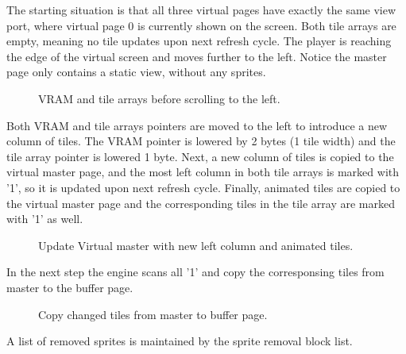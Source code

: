 \documentclass[book.tex]{subfiles}
\begin{document}
\vspace{0.5cm}
\par
\begin{minipage}{\textwidth}
  
\end{minipage}
\label{state_type}


\pagebreak

The starting situation is that all three virtual pages have exactly the same view port, where virtual page 0 is currently shown on the screen. Both tile arrays are empty, meaning no tile updates upon next refresh cycle. The player is reaching the edge of the virtual screen and moves further to the left. Notice the master page only contains a static view, without any sprites. 

\begin{figure}[H]
\centering
 \caption{VRAM and tile arrays before scrolling to the left.}
 \label{fig:kc4_6_step0}
\end{figure}

\pagebreak

Both VRAM and tile arrays pointers are moved to the left to introduce a new column of tiles. The VRAM pointer is lowered by 2 bytes (1 tile width) and the tile array pointer is lowered 1 byte. Next, a new column of tiles is copied to the virtual master page, and the most left column in both tile arrays is marked with '1', so it is updated upon next refresh cycle. Finally, animated tiles are copied to the virtual master page and the corresponding tiles in the tile array are marked with '1' as well.

\begin{figure}[H]
\centering
 \caption{Update Virtual master with new left column and animated tiles.}
 \label{fig:kc4_6_step1}
\end{figure}

\pagebreak

In the next step the engine scans all '1' and copy the corresponsing tiles from master to the buffer page. \\ 

\begin{figure}[H]
\centering
 \caption{Copy changed tiles from master to buffer page.}
 \label{fig:kc4_6_step2}
\end{figure}

\pagebreak
A list of removed sprites is maintained by the sprite removal block list. \\
\par
\begin{minipage}{\textwidth}
  
  \end{minipage}
  \label{block_removal}
\end{document}
